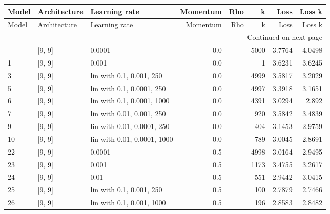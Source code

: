 \begin{longtable}{lllrrrrr}
\label{tab:Results_filtered}\\
\toprule
Model &       Architecture &               Learning rate & Momentum & Rho &    k &     Loss &   Loss k \\
\midrule
\endfirsthead

\toprule
Model &       Architecture &               Learning rate & Momentum & Rho &    k &     Loss &   Loss k \\
\midrule
\endhead
\midrule
\multicolumn{8}{r}{{Continued on next page}} \\
\midrule
\endfoot

\bottomrule
\endlastfoot
    0 &             [9, 9] &                      0.0001 &      0.0 &     & 5000 &   3.7764 &   4.0498 \\
    1 &             [9, 9] &                       0.001 &      0.0 &     &    1 &   3.6231 &   3.6245 \\
    3 &             [9, 9] &    lin with 0.1, 0.001, 250 &      0.0 &     & 4999 &   3.5817 &   3.2029 \\
    5 &             [9, 9] &   lin with 0.1, 0.0001, 250 &      0.0 &     & 4997 &   3.3918 &   3.1651 \\
    6 &             [9, 9] &  lin with 0.1, 0.0001, 1000 &      0.0 &     & 4391 &   3.0294 &    2.892 \\
    7 &             [9, 9] &   lin with 0.01, 0.001, 250 &      0.0 &     &  920 &   3.5842 &   3.4839 \\
    9 &             [9, 9] &  lin with 0.01, 0.0001, 250 &      0.0 &     &  404 &   3.1453 &   2.9759 \\
   10 &             [9, 9] & lin with 0.01, 0.0001, 1000 &      0.0 &     &  789 &   3.0045 &   2.8691 \\
   22 &             [9, 9] &                      0.0001 &      0.5 &     & 4998 &   3.0164 &   2.9495 \\
   23 &             [9, 9] &                       0.001 &      0.5 &     & 1173 &   3.4755 &   3.2617 \\
   24 &             [9, 9] &                        0.01 &      0.5 &     &  551 &   2.9442 &   3.0415 \\
   25 &             [9, 9] &    lin with 0.1, 0.001, 250 &      0.5 &     &  100 &   2.7879 &   2.7466 \\
   26 &             [9, 9] &   lin with 0.1, 0.001, 1000 &      0.5 &     &  196 &   2.8583 &   2.8482 \\

\end{longtable}
